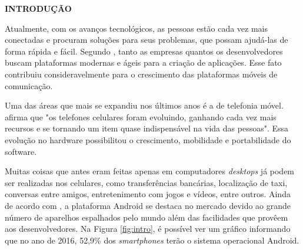   \vspace{1.2em}
  \textbf{\large INTRODUÇÃO}
  \vspace{2.9em}
\thispagestyle{empty}


	\par Atualmente, com os avanços tecnológicos, as pessoas estão cada vez mais
conectadas e procuram soluções para seus problemas, que possam ajudá-las de
forma rápida e fácil.  Segundo , tanto as empresas
quantos os desenvolvedores buscam plataformas modernas e ágeis para a criação
de aplicações. Esse fato contribuiu consideravelmente para o crescimento das
plataformas móveis de comunicação.

	\par Uma das áreas que mais se expandiu nos últimos anos é a de telefonia
móvel.  afirma que "os telefones celulares foram
evoluindo, ganhando cada vez mais recursos e se tornando um item quase
indispensável na vida das pessoas". Essa evolução no hardware possibilitou o
crescimento, mobilidade e portabilidade do software.

	\par Muitas coisas que antes eram feitas apenas em computadores
\textit{desktops} já podem ser realizadas nos celulares, como transferências
bancárias, localização de taxi, conversas entre amigos, entretenimento com
jogos e vídeos, entre outros. Ainda de acordo com , a
plataforma Android se destaca no mercado devido ao grande número de aparelhos
espalhados pelo mundo além das facilidades que provêem aos desenvolvedores. Na
Figura \ref{fig:intro}, é possível ver um gráfico informando que no ano de
2016, 52,9\% dos \textit{smartphones} terão o sistema operacional Android.

